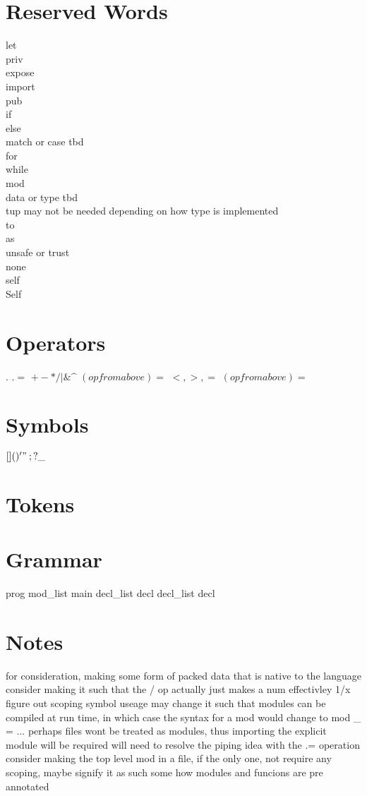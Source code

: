 \documentclass{article}
\begin{document}
	\section{Reserved Words}
		let\\
		priv\\
		expose\\
		import\\
		pub\\
		if\\
		else\\ 
		match or case tbd\\
		for\\
		while\\
		mod\\
		data or type tbd\\
		tup may not be needed depending on how type is implemented\\ 
		to\\
		as\\
		unsafe or trust\\
		none\\
		self\\
		Self\\
	\section{Operators}
		$.$
		$.=$
		$+ - * / | \& \^$
		$(op from above)=$
		$<, >, =$
		$(op from above)=$
	\section{Symbols}
		$[ ]
		( )
		{ }
		' "
		\: ;
		? \_$

	\section{Tokens}
		

	\section{Grammar}
		prog
			mod\_list main 
		decl\_list
			decl decl\_list 
		decl 

	\section{Notes}
		for consideration, making some form of packed data that is native to the language 
		consider making it such that the / op actually just makes a num effectivley 1/x
		figure out scoping symbol useage 
		may change it such that modules can be compiled at run time, in which case the syntax for a mod would change to
			mod \_ = ...
		perhaps files wont be treated as modules, thus importing the explicit module will be required 
		will need to resolve the piping idea with the .= operation
		consider making the top level mod in a file, if the only one, not require any scoping, maybe signify it as such some how 
		modules and funcions are pre annotated
\end{document}

